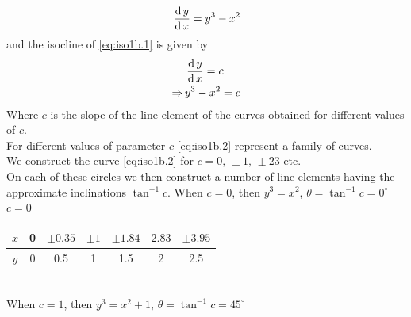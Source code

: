 \documentclass[../main-sheet.tex]{subfiles}
\begin{document}
\begin{soln}[b]
    \begin{equation}
        \,\frac{\mathrm{d}\,y}{\mathrm{d}\,x}=y^3-x^2\label{eq:iso1b.1}
    \end{equation}
    and the isocline of \eqref{eq:iso1b.1} is given by 
    \begin{align}
        &\,\frac{\mathrm{d}\,y}{\mathrm{d}\,x}=c\notag\\
        \Rightarrow\,&y^3-x^2=c\label{eq:iso1b.2}
    \end{align}
    Where \(c\) is the slope of the line element of the curves obtained for different values of \(c\).\\
    For different values of parameter \(c\) \eqref{eq:iso1b.2} represent a family of curves.\\
    We construct the curve \eqref{eq:iso1b.2} for \(c=0,\,\pm 1,\,\pm23\) etc.\\
    On each of these circles we then construct a number of line elements having the approximate inclinations \(\tan^{-1}c\).
    When \(c=0\), then \(y^3=x^2\), \(\theta=\tan^{-1}c=0^{\circ}\)\\
    \(c=0\) \begin{tabular}{|c|c|c|c|c|c|c|}
        \hline
        \(x\) & 0& \(\pm 0.35\) & \(\pm 1\) & \(\pm 1.84\) & \(2.83\) & \(\pm 3.95\)\\\hline
        \(y\) & 0& 0.5 & 1 & 1.5 & 2 & 2.5\\\hline
    \end{tabular}\\
    When \(c=1\), then \(y^3=x^2+1\), \(\theta=\tan^{-1}c=45^{\circ}\)\\

\end{soln}
\end{document}
